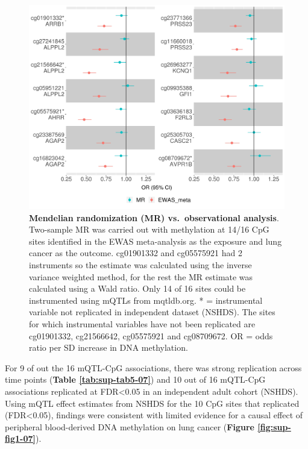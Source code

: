 \documentclass[11pt,oneside]{bristolthesis}
\begin{document}
\begin{figure}

{\centering \includegraphics[width=1\linewidth]{figure/07-dnam_lungcancer_mr/Figure_3} 

}

\caption[Mendelian randomization (MR) vs.~observational analysis]{\textbf{Mendelian randomization (MR) vs.~observational analysis}. Two-sample MR was carried out with methylation at 14/16 CpG sites identified in the EWAS meta-analysis as the exposure and lung cancer as the outcome. cg01901332 and cg05575921 had 2 instruments so the estimate was calculated using the inverse variance weighted method, for the rest the MR estimate was calculated using a Wald ratio. Only 14 of 16 sites could be instrumented using mQTLs from mqtldb.org. * = instrumental variable not replicated in independent dataset (NSHDS). The sites for which instrumental variables have not been replicated are cg01901332, cg21566642, cg05575921 and cg08709672. OR = odds ratio per SD increase in DNA methylation.}\label{fig:fig3-07}
\end{figure}
For 9 of out the 16 mQTL-CpG associations, there was strong replication across time points (\textbf{Table \ref{tab:sup-tab5-07}}) and 10 out of 16 mQTL-CpG associations replicated at FDR\textless0.05 in an independent adult cohort (NSHDS). Using mQTL effect estimates from NSHDS for the 10 CpG sites that replicated (FDR\textless0.05), findings were consistent with limited evidence for a causal effect of peripheral blood-derived DNA methylation on lung cancer (\textbf{Figure \ref{fig:sup-fig1-07}}).
\end{document}
